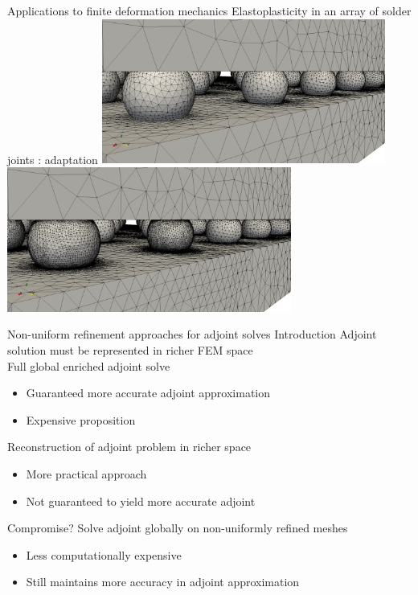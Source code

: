 \documentclass[fleqn]{beamer}
\begin{document}

\begin{frame}{Applications to finite deformation mechanics}
{Elastoplasticity in an array of solder joints : adaptation}
\centering
\includegraphics[width=0.7\textwidth]{../img/aut_solder_mesh_initial2} \\
\includegraphics[width=0.7\textwidth]{../img/aut_solder_mesh_final2}
\end{frame}


\begin{frame}{Non-uniform refinement approaches for adjoint solves}
{Introduction}
Adjoint solution must be represented in richer FEM space \\
Full global enriched adjoint solve
\begin{itemize}
\item Guaranteed more accurate adjoint approximation
\item Expensive proposition
\end{itemize}
Reconstruction of adjoint problem in richer space
\begin{itemize}
\item More practical approach
\item Not guaranteed to yield more accurate adjoint
\end{itemize}
Compromise? Solve adjoint globally on non-uniformly refined meshes \\
\begin{itemize}
\item Less computationally expensive
\item Still maintains more accuracy in adjoint approximation
\end{itemize}
\end{frame}
\end{document}
